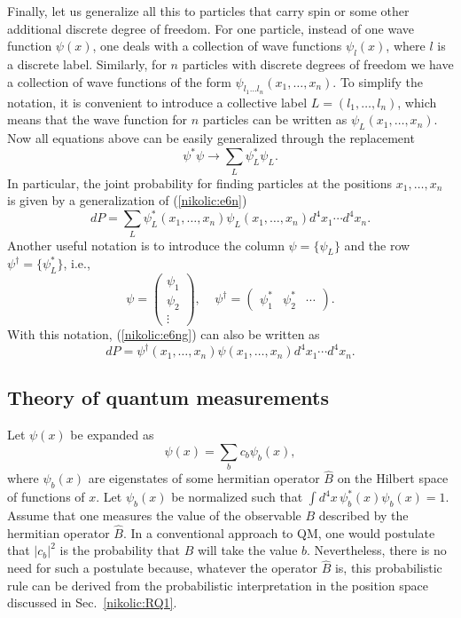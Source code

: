 \documentclass[12pt,twoside]{report} %
\begin{document}
Finally, let us generalize all this to particles that carry spin or some other additional
discrete degree of freedom. For one particle, instead of one wave function
$\psi(x)$, one deals with a collection of wave functions $\psi_l(x)$, where $l$ is a discrete label.
Similarly, for $n$ particles with discrete degrees of freedom we have 
a collection of wave functions of the form $\psi_{l_1\dots l_n}(x_1,\ldots,x_n)$.
To simplify the notation, it is convenient to introduce a 
collective label $L=(l_1,\ldots,l_n)$, which means that the wave function for
$n$ particles can be written as $\psi_{L}(x_1,\ldots,x_n)$.
Now all equations above can be easily generalized through the replacement
\begin{equation}
 \psi^*\psi \rightarrow \sum_L \psi_L^*\psi_L . 
\end{equation}
In particular, the joint probability for finding particles at the positions
$x_1,\ldots,x_n$ is given by a generalization of (\ref{nikolic:e6n}) 
\begin{equation}\label{nikolic:e6ng}
dP=\sum_L \psi_L^*(x_1,\ldots,x_n) \psi_L(x_1,\ldots,x_n) d^4x_1 \cdots d^4x_n .
\end{equation}
Another useful notation is to introduce the column $\psi=\{ \psi_L \}$ 
and the row $\psi^{\dagger}=\{ \psi^*_L \}$, i.e., 
\begin{equation}
\psi=\left( 
\begin{array}{c} 
 \psi_1 \\ \psi_2 \\ \vdots
\end{array}
\right) , \;\;\;\;
 \psi^{\dagger}=\left( 
\begin{array}{ccc} 
 \psi_1^* & \psi_2^* & \cdots
\end{array}
\right) .
\end{equation}
With this notation, (\ref{nikolic:e6ng}) can also be written as
\begin{equation}\label{nikolic:e6ng2}
dP=\psi^{\dagger}(x_1,\ldots,x_n) \psi(x_1,\ldots,x_n) d^4x_1 \cdots d^4x_n .
\end{equation}

\subsection{Theory of quantum measurements}
\label{nikolic:RQ2}

Let $\psi(x)$ be expanded as
\begin{equation}\label{nikolic:meas0}
 \psi(x)=\sum_b c_b \psi_b(x) ,
\end{equation}
where $\psi_b(x)$ are eigenstates of some hermitian operator $\hat{B}$ on the Hilbert space
of functions of $x$. Let $\psi_b(x)$ be normalized such that 
$\int d^4x \, \psi^*_b(x)\psi_b(x) =1$. Assume that one measures the value
of the observable $B$ described by the hermitian operator $\hat{B}$.
In a conventional approach to QM, one would postulate that $|c_b|^2$ is the probability that 
$B$ will take the value $b$. Nevertheless, there is no need for such a postulate
because, whatever the operator $\hat{B}$ is, this probabilistic rule can be derived
from the probabilistic interpretation in the position space discussed in Sec.~\ref{nikolic:RQ1}. 
\end{document}
